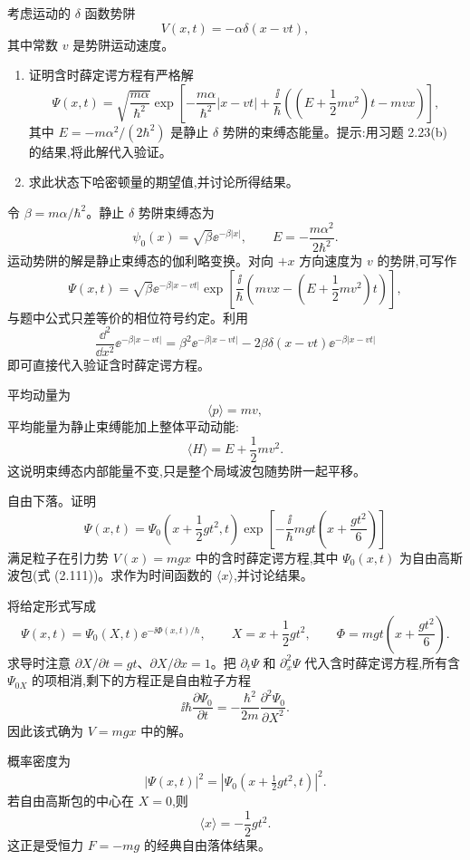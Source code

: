 \begin{question}
考虑运动的 $\delta$ 函数势阱
\[
V(x,t)=-\alpha\delta(x-vt),
\]
其中常数 $v$ 是势阱运动速度。
\begin{enumerate}
\item 证明含时薛定谔方程有严格解
\[
\Psi(x,t)=\sqrt{\frac{m\alpha}{\hbar^2}}
\exp\!\left[-\frac{m\alpha}{\hbar^2}|x-vt|+\frac{\ii}{\hbar}\left((E+\frac12mv^2)t-mvx\right)\right],
\]
其中 $E=-m\alpha^2/(2\hbar^2)$ 是静止 $\delta$ 势阱的束缚态能量。提示:用习题 2.23(b) 的结果,将此解代入验证。
\item 求此状态下哈密顿量的期望值,并讨论所得结果。
\end{enumerate}
\end{question}
\begin{solution}
令 $\beta=m\alpha/\hbar^2$。静止 $\delta$ 势阱束缚态为
\[
\psi_0(x)=\sqrt\beta \ee^{-\beta|x|},
\qquad
E=-\frac{m\alpha^2}{2\hbar^2}.
\]
运动势阱的解是静止束缚态的伽利略变换。对向 $+x$ 方向速度为 $v$ 的势阱,可写作
\[
\Psi(x,t)=\sqrt\beta \ee^{-\beta|x-vt|}
\exp\left[\frac{\ii}{\hbar}\left(mvx-\left(E+\frac12mv^2\right)t\right)\right],
\]
与题中公式只差等价的相位符号约定。利用
\[
\frac{\dd^2}{\dd x^2}\ee^{-\beta|x-vt|}
=\beta^2\ee^{-\beta|x-vt|}-2\beta\delta(x-vt)\ee^{-\beta|x-vt|}
\]
即可直接代入验证含时薛定谔方程。

平均动量为
\[
\langle p\rangle=mv,
\]
平均能量为静止束缚能加上整体平动动能:
\[
\langle H\rangle=E+\frac12mv^2.
\]
这说明束缚态内部能量不变,只是整个局域波包随势阱一起平移。
\end{solution}

\begin{question}
自由下落。证明
\[
\Psi(x,t)=\Psi_0\left(x+\frac12gt^2,t\right)
\exp\left[-\frac{\ii}{\hbar}mgt\left(x+\frac{g t^2}{6}\right)\right]
\]
满足粒子在引力势 $V(x)=mgx$ 中的含时薛定谔方程,其中 $\Psi_0(x,t)$ 为自由高斯波包(式 (2.111))。求作为时间函数的 $\langle x\rangle$,并讨论结果。

\par\smallskip
{}

\end{question}
\begin{solution}
将给定形式写成
\[
\Psi(x,t)=\Psi_0(X,t)\ee^{-\ii\Phi(x,t)/\hbar},
\qquad
X=x+\frac12gt^2,
\qquad
\Phi=mgt\left(x+\frac{gt^2}{6}\right).
\]
求导时注意 $\partial X/\partial t=gt$、$\partial X/\partial x=1$。把 $\partial_t\Psi$ 和 $\partial_x^2\Psi$ 代入含时薛定谔方程,所有含 $\Psi_{0X}$ 的项相消,剩下的方程正是自由粒子方程
\[
\ii\hbar\frac{\partial\Psi_0}{\partial t}
=-\frac{\hbar^2}{2m}\frac{\partial^2\Psi_0}{\partial X^2}.
\]
因此该式确为 $V=mgx$ 中的解。

概率密度为
\[
|\Psi(x,t)|^2=|\Psi_0(x+\tfrac12gt^2,t)|^2.
\]
若自由高斯包的中心在 $X=0$,则
\[
\langle x\rangle=-\frac12gt^2.
\]
这正是受恒力 $F=-mg$ 的经典自由落体结果。
\end{solution}

